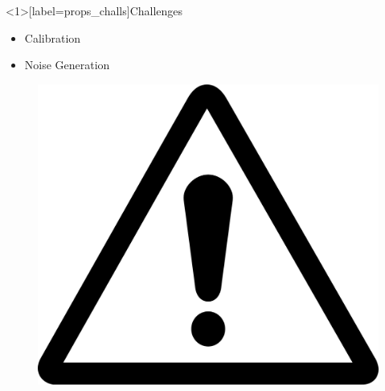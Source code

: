 \documentclass[aspectratio=169]{beamer}
[aspectratio=169] %
\begin{document}
\begin{frame}<1>[label=props_challs]{Challenges}
  \begin{minipage}{0.49\textwidth} 
    \begin{itemize}
      \item<1> Calibration
      \item<2> Noise Generation
    \end{itemize}
  \end{minipage}
  \hfill
  \begin{minipage}{0.49\textwidth} 
    \begin{figure}
      \centering
      \includegraphics[height=0.5\textheight]{figures/exclamation.png}
    \end{figure}
  \end{minipage}
\end{frame}
\end{document}
